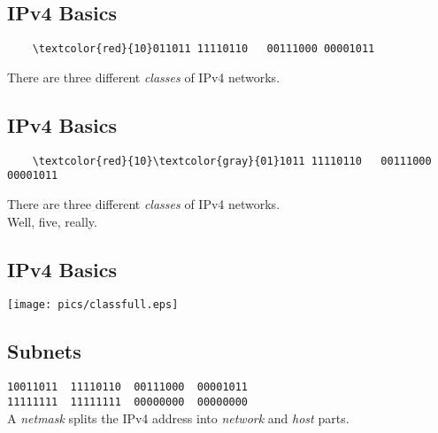 \documentclass[xga]{xdvislides}
\begin{document}
\subsection{IPv4 Basics}
\vspace{.5in}
\Hugesize
\begin{center}
\begin{Verbatim}
    \textcolor{red}{10}011011 11110110   00111000 00001011
\end{Verbatim}
\vspace{.5in}
There are three different {\em classes} of IPv4 networks.
\end{center}
\Normalsize

\subsection{IPv4 Basics}
\vspace{.5in}
\Hugesize
\begin{center}
\begin{Verbatim}
    \textcolor{red}{10}\textcolor{gray}{01}1011 11110110   00111000 00001011
\end{Verbatim}
\vspace{.5in}
There are three different {\em classes} of IPv4 networks. \\
Well, five, really.
\end{center}
\Normalsize

\subsection{IPv4 Basics}
\vspace*{\fill}
\begin{center}
	\texttt{[image: pics/classfull.eps]}
\end{center}
\vspace*{\fill}

\subsection{Subnets}
\vspace{.5in}
\Hugesize
\begin{center}
\verb|10011011  11110110  00111000  00001011| \\

\verb|11111111  11111111  00000000  00000000| \\
\vspace{.5in}
A {\em netmask} splits the IPv4 address into {\em network} and {\em host}
parts.
\end{center}
\Normalsize
\end{document}
